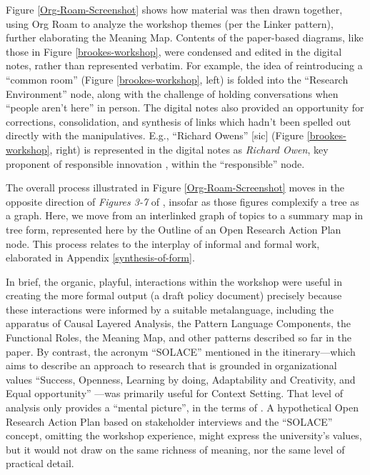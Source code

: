 \documentclass[acmlarge,timestamp]{acmart}
\begin{document}
Figure \ref{Org-Roam-Screenshot} shows how material was then drawn
together, using Org Roam to analyze the workshop themes (per the {\sc
  Linker} pattern), further elaborating the {\sc Meaning Map}.
Contents of the paper-based diagrams, like those in Figure
\ref{brookes-workshop}, were condensed and edited in the digital
notes, rather than represented verbatim.  For example, the idea of
reintroducing a ``common room'' (Figure \ref{brookes-workshop}, left)
is folded into the ``Research Environment'' node, along with the
challenge of holding conversations when “people aren’t here” in
person.  The digital notes also provided an opportunity for
corrections, consolidation, and synthesis of links which hadn’t been
spelled out directly with the manipulatives. E.g., ``Richard Owens''
[sic] (Figure \ref{brookes-workshop}, right) is represented in the
digital notes as \emph{Richard Owen}, key proponent of responsible
innovation \cite{Owen2013}, within the ``responsible'' node.

The overall process illustrated in Figure \ref{Org-Roam-Screenshot}
moves in the opposite direction of \emph{Figures 3-7} of
\citet{iba2016pattern}, insofar as those figures complexify a tree as
a graph.  Here, we move from an interlinked graph of topics to a
summary map in tree form, represented here by the Outline of an Open
Research Action Plan node.  This process relates to the interplay of
informal and formal work, elaborated in Appendix
\ref{synthesis-of-form}.

In brief, the organic, playful, interactions within the workshop were
useful in creating the more formal output (a draft policy document)
precisely because these interactions were informed by a suitable
metalanguage, including the apparatus of Causal Layered Analysis, the
{\sc Pattern Language Components}, the {\sc Functional Roles}, the
{\sc Meaning Map}, and other patterns described so far in the paper.
By contrast, the acronym ``SOLACE'' mentioned in the itinerary—which
aims to describe an approach to research that is grounded in
organizational values “Success, Openness, Learning by doing,
Adaptability and Creativity, and Equal opportunity”
\cite{corneli-varuf}—was primarily useful for {\sc Context Setting}.
That level of analysis only provides a “mental picture”, in the terms
of \citet{alexander1964notes}.  A hypothetical Open Research Action
Plan based on stakeholder interviews and the “SOLACE” concept,
omitting the workshop experience, might express the university’s
values, but it would not draw on the same richness of meaning, nor the
same level of practical detail.
\end{document}
